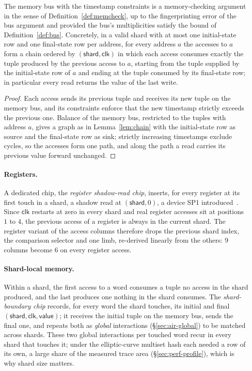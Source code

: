 \begin{lemma}
\label{lem:memory}
The memory bus with the timestamp constraints is a memory-checking argument in the sense of Definition~\ref{def:memcheck}, up to the fingerprinting error of the bus argument and provided the bus's multiplicities satisfy the bound of Definition~\ref{def:bus}. Concretely, in a valid shard with at most one initial-state row and one final-state row per address, for every address $a$ the accesses to $a$ form a chain ordered by $(\mathsf{shard}, \mathsf{clk})$ in which each access consumes exactly the tuple produced by the previous access to $a$, starting from the tuple supplied by the initial-state row of $a$ and ending at the tuple consumed by its final-state row; in particular every read returns the value of the last write.
\end{lemma}
\begin{proof}
Each access sends its previous tuple and receives its new tuple on the memory bus, and its constraints enforce that the new timestamp strictly exceeds the previous one. Balance of the memory bus, restricted to the tuples with address $a$, gives a graph as in Lemma~\ref{lem:chain} with the initial-state row as source and the final-state row as sink; strictly increasing timestamps exclude cycles, so the accesses form one path, and along the path a read carries its previous value forward unchanged.
\end{proof}

\paragraph{Registers.} A dedicated chip, the \emph{register shadow-read chip}, inserts, for every register at its first touch in a shard, a shadow read at $(\mathsf{shard}, 0)$, a device SP1 introduced~\citep{sp1}. Since $\mathsf{clk}$ restarts at zero in every shard and real register accesses sit at positions $1$ to $4$, the previous access of a register is always in the current shard. The register variant of the access columns therefore drops the previous shard index, the comparison selector and one limb, re-derived linearly from the others: 9 columns become 6 on every register access.

\paragraph{Shard-local memory.} Within a shard, the first access to a word consumes a tuple no access in the shard produced, and the last produces one nothing in the shard consumes. The \emph{shard-boundary chip} records, for every word the shard touches, its initial and final $(\mathsf{shard}, \mathsf{clk}, \mathsf{value})$; it receives the initial tuple on the memory bus, sends the final one, and repeats both as \emph{global} interactions (\S\ref{sec:air-global}) to be matched across shards. These two global interactions per touched word recur in every shard that touches it; under the elliptic-curve multiset hash each needed a row of its own, a large share of the measured trace area (\S\ref{sec:perf-profile}), which is why shard size matters.

